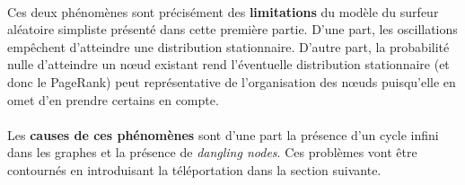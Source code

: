 \documentclass[a4paper,titlepage]{report}
\begin{document}
\paragraph{}
Ces deux phénomènes sont précisément des \textbf{limitations} du modèle du surfeur aléatoire simpliste présenté dans cette première partie. D'une part, les oscillations empêchent d'atteindre une distribution stationnaire. D'autre part, la probabilité nulle d'atteindre un nœud existant rend l'éventuelle distribution stationnaire (et donc le PageRank) peut représentative de l'organisation des nœuds puisqu'elle en omet d'en prendre certains en compte.
\paragraph{}
Les\textbf{ causes de ces phénomènes} sont d'une part la présence d'un cycle  infini dans les graphes et la présence de \textit{dangling nodes}. Ces problèmes vont être contournés en introduisant la téléportation dans la section suivante.
\end{document}
